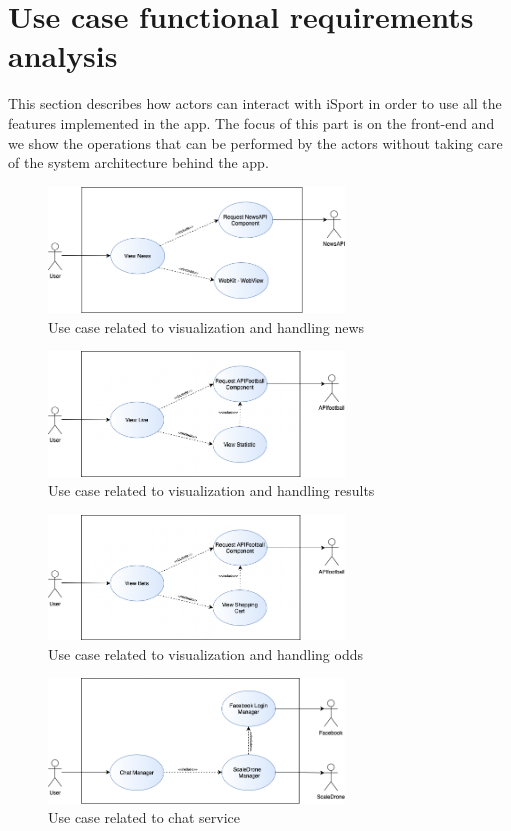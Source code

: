 \documentclass[numbers=noenddot, 12pt, a4paper, oneside]{scrbook}
\begin{document}
\chapter{Use case functional requirements analysis}
This section describes how actors can interact with iSport in order to use all the features implemented in the app. The focus of this part is on the front-end and we show the operations that can be performed by the actors without taking care of the system architecture behind the app.
\begin{figure}[H]
	\centering
	\includegraphics[width=0.7\textwidth]{images/ViewNews}
	\caption{Use case related to visualization and handling news}
\end{figure}
\begin{figure}[H]
	\centering
	\includegraphics[width=0.7\textwidth]{images/ViewLive}
	\caption{Use case related to visualization and handling results}
\end{figure}
\begin{figure}[H]
	\centering
	\includegraphics[width=0.7\textwidth]{images/ViewBet}
	\caption{Use case related to visualization and handling odds}
\end{figure}
\begin{figure}[H]
	\centering
	\includegraphics[width=0.7\textwidth]{images/Chat}
	\caption{Use case related to chat service}
\end{figure}
\end{document}
